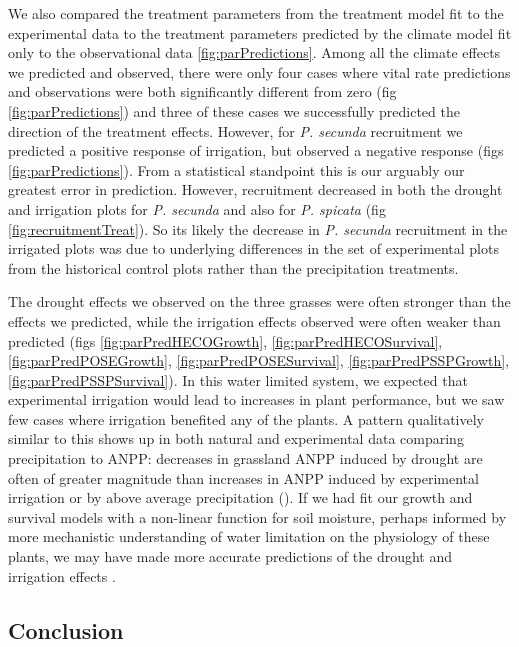 \documentclass[11pt]{article}
\begin{document}
\begin{doublespace}
We also compared the treatment parameters from the treatment model fit to the experimental data to the treatment parameters predicted by the climate model fit only to the observational data \ref{fig:parPredictions}. Among all the climate effects we predicted and observed, there were only four cases where vital rate predictions and observations were both significantly different from zero (fig \ref{fig:parPredictions}) and three of these cases we successfully predicted the direction of the treatment effects. However, for \textit{P. secunda} recruitment we predicted a positive response of irrigation, but observed a negative response (figs \ref{fig:parPredictions}). From a statistical standpoint this is our arguably our greatest error in prediction. However, recruitment decreased in both the drought and irrigation plots for \textit{P. secunda} and also for \textit{P. spicata} (fig \ref{fig:recruitmentTreat}). So its likely the decrease in \textit{P. secunda} recruitment in the irrigated plots was due to underlying differences in the set of experimental plots from the historical control plots rather than the precipitation treatments.  

The drought effects we observed on the three grasses were often stronger than the effects we predicted, while the irrigation effects observed were often weaker than predicted (figs \ref{fig:parPredHECOGrowth}, \ref{fig:parPredHECOSurvival}, \ref{fig:parPredPOSEGrowth}, \ref{fig:parPredPOSESurvival}, \ref{fig:parPredPSSPGrowth}, \ref{fig:parPredPSSPSurvival}). In this water limited system, we expected that experimental irrigation would lead to increases in plant performance, but we saw few cases where irrigation benefited any of the plants. A pattern qualitatively similar to this shows up in both natural and experimental data comparing precipitation to ANPP: decreases in grassland ANPP induced by drought are often of greater magnitude than increases in ANPP induced by experimental irrigation or by above average precipitation (\citep{hsu_anticipating_2014,gherardi_enhanced_2015}). If we had fit our growth and survival models with a non-linear function for soil moisture, perhaps informed by more mechanistic understanding of water limitation on the physiology of these plants, we may have made more accurate predictions of the drought and irrigation effects \citep{ehrlen_advancing_2016}.

\subsection*{Conclusion}


\end{doublespace}
\end{document}
